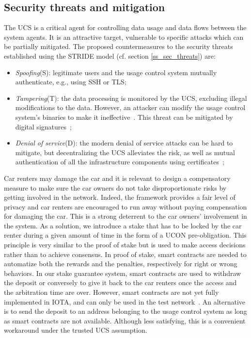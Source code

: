\subsection{Security threats and mitigation}
\label{ss_security_threats_and_mitigation}
The UCS is a critical agent for controlling data usage and data flows between the system agents. It is an attractive target, vulnerable to specific attacks which can be partially mitigated. The proposed countermeasures to the security threats established using the STRIDE model (cf. section \ref{ss_sec_threats}) are:
\begin{itemize}
    \item \emph{Spoofing}(S): legitimate users and the usage control system mutually authenticate, e.g., using SSH or TLS;
    \item \emph{Tampering}(T): the data processing is monitored by the UCS, excluding illegal modifications to the data. However, an attacker can modify the usage control system's binaries to make it ineffective~\cite{Kelbert2018}. This threat can be mitigated by digital signatures~\cite{Kelbert2018};
    \item \emph{Denial of service}(D): the modern denial of service attacks can be hard to mitigate, but decentralizing the UCS alleviates the risk, as well as mutual authentication of all the infrastructure components using certificates~\cite{Kelbert2018};
\end{itemize}

 Car renters may damage the car and it is relevant to design a compensatory measure to make sure the car owners do not take disproportionate risks by getting involved in the network. Indeed, the framework provides a fair level of privacy and car renters are encouraged to run away without paying compensation for damaging the car. This is a strong deterrent to the car owners' involvement in the system.
As a solution, we introduce a stake that has to be locked by the car renter during a given amount of time in the form of a UCON pre-obligation. This principle is very similar to the proof of stake but is used to make access decisions rather than to achieve consensus. In proof of stake, smart contracts are needed to automatize both the rewards and the penalties, respectively for right or wrong behaviors. In our stake guarantee system, smart contracts are used to withdraw the deposit or conversely to give it back to the car renters once the access and the arbitration time are over. However, smart contracts are not yet fully implemented in IOTA, and can only be used in the test network~\cite{SC2021}. An alternative is to send the deposit to an address belonging to the usage control system as long as smart contracts are not available. Although less satisfying, this is a convenient workaround under the trusted UCS assumption.


